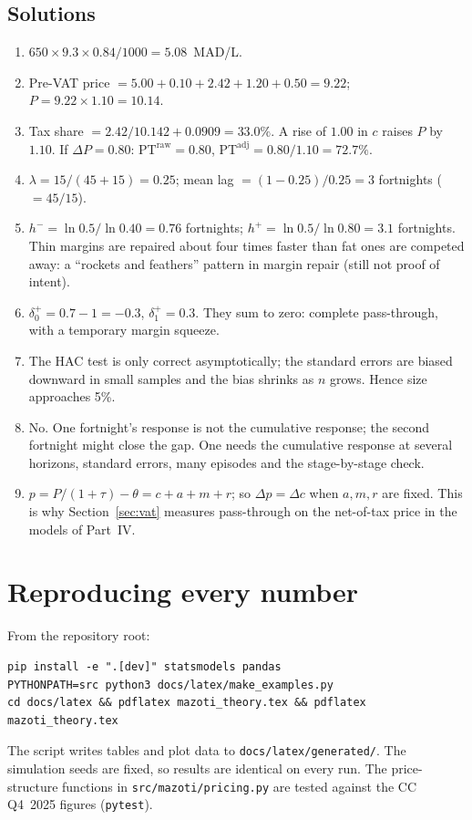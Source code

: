 \documentclass[11pt,a4paper]{article}
\theoremstyle{definition}
\newcommand{\PT}{\mathrm{PT}}
\begin{document}
\subsection*{Solutions}
\begin{enumerate}[label=\textbf{E\arabic*.},leftmargin=2.5em]
\item $650\times9.3\times0.84/1000=5.08$~MAD/L.
\item Pre-VAT price $=5.00+0.10+2.42+1.20+0.50=9.22$; $P=9.22\times1.10=10.14$.
\item Tax share $=2.42/10.142+0.0909=33.0\%$. A rise of $1.00$ in $c$ raises $P$ by $1.10$. If $\Delta P=0.80$: $\PT^{\text{raw}}=0.80$, $\PT^{\text{adj}}=0.80/1.10=72.7\%$.
\item $\lambda=15/(45+15)=0.25$; mean lag $=(1-0.25)/0.25=3$ fortnights ($=45/15$).
\item $h^{-}=\ln0.5/\ln0.40=0.76$ fortnights; $h^{+}=\ln0.5/\ln0.80=3.1$ fortnights. Thin margins are repaired about four times faster than fat ones are competed away: a ``rockets and feathers'' pattern in margin repair (still not proof of intent).
\item $\delta^{+}_0=0.7-1=-0.3$, $\delta^{+}_1=0.3$. They sum to zero: complete pass-through, with a temporary margin squeeze.
\item The HAC test is only correct asymptotically; the standard errors are biased downward in small samples and the bias shrinks as $n$ grows. Hence size approaches 5\%.
\item No. One fortnight's response is not the cumulative response; the second fortnight might close the gap. One needs the cumulative response at several horizons, standard errors, many episodes and the stage-by-stage check.
\item $p=P/(1+\tau)-\theta=c+a+m+r$; so $\Delta p=\Delta c$ when $a,m,r$ are fixed. This is why Section~\ref{sec:vat} measures pass-through on the net-of-tax price in the models of Part~IV.
\end{enumerate}

\section{Reproducing every number}

From the repository root:
\begin{verbatim}
pip install -e ".[dev]" statsmodels pandas
PYTHONPATH=src python3 docs/latex/make_examples.py
cd docs/latex && pdflatex mazoti_theory.tex && pdflatex mazoti_theory.tex
\end{verbatim}
The script writes tables and plot data to \texttt{docs/latex/generated/}. The simulation seeds are fixed, so results are identical on every run. The price-structure functions in \texttt{src/mazoti/pricing.py} are tested against the CC Q4~2025 figures (\texttt{pytest}).
\end{document}
